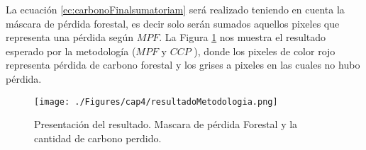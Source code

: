 
La ecuaci\'on  \ref{ec:carbonoFinalsumatoriam} ser\'a realizado teniendo en cuenta la m\'ascara de p\'erdida forestal, es decir solo ser\'an sumados aquellos pixeles que representa una p\'erdida seg\'un $ MPF $. La Figura \ref{fig:resulPC} nos muestra el resultado esperado por la metodolog\'ia ($ MPF $ y $ CCP $ ), donde los pixeles de color rojo representa p\'erdida de carbono forestal y los grises a pixeles en las cuales no hubo p\'erdida.
\begin{figure}[H]
	\centering
	\texttt{[image: ./Figures/cap4/resultadoMetodologia.png]}
	\caption{Presentaci\'on del resultado. Mascara de p\'erdida Forestal y la cantidad de carbono perdido.}
	\label{fig:resulPC}
\end{figure}
